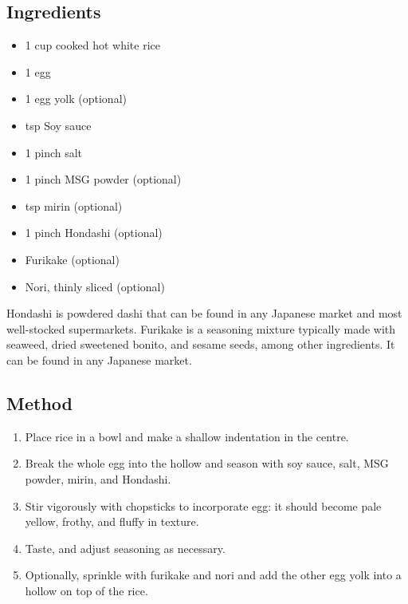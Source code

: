   \begin{multicols}{2}
    \subsection{Ingredients}
      \begin{itemize}
        \item 1 cup cooked hot white rice
        \item 1 egg
        \item 1 egg yolk (optional)
        \item {} tsp Soy sauce
        \item 1 pinch salt
        \item 1 pinch MSG powder (optional)
        \item {} tsp mirin (optional)
        \item 1 pinch Hondashi (optional)
        \item Furikake (optional)
        \item Nori, thinly sliced (optional)
      \end{itemize}
      Hondashi is powdered dashi that can be found in any Japanese market and most well-stocked supermarkets. Furikake is a seasoning mixture typically made with seaweed, dried sweetened bonito, and sesame seeds, among other ingredients. It can be found in any Japanese market.
  \vfill\null
  \columnbreak
  \subsection{Method}
    \begin{enumerate}
      \item Place rice in a bowl and make a shallow indentation in the centre.
      \item Break the whole egg into the hollow and season with soy sauce, salt, MSG powder, mirin, and Hondashi.
      \item Stir vigorously with chopsticks to incorporate egg: it should become pale yellow, frothy, and fluffy in texture.
      \item Taste, and adjust seasoning as necessary.
      \item Optionally, sprinkle with furikake and nori and add the other egg yolk into a hollow on top of the rice.
    \end{enumerate}
  \end{multicols}

